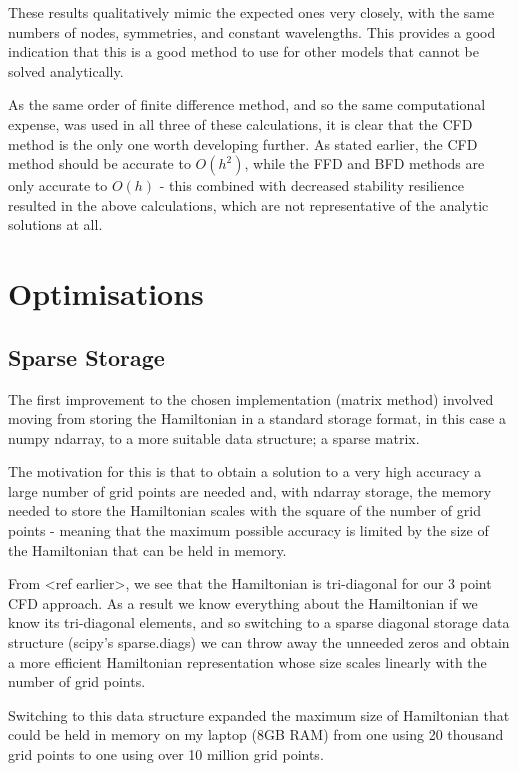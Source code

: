 These results qualitatively mimic the expected ones very closely, with the same numbers of nodes, symmetries, and constant wavelengths. This provides a good indication that this is a good method to use for other models that cannot be solved analytically.

As the same order of finite difference method, and so the same computational expense, was used in all three of these calculations, it is clear that the CFD method is the only one worth developing further. As stated earlier, the CFD method should be accurate to $O(h^{2})$, while the FFD and BFD methods are only accurate to $O(h)$ - this combined with decreased stability resilience resulted in the above calculations, which are not representative of the analytic solutions at all.

\section{Optimisations}

\subsection{Sparse Storage}
The first improvement to the chosen implementation (matrix method) involved moving from storing the Hamiltonian in a standard storage format, in this case a numpy ndarray, to a more suitable data structure; a sparse matrix. 

The motivation for this is that to obtain a solution to a very high accuracy a large number of grid points are needed and, with ndarray storage, the memory needed to store the Hamiltonian scales with the square of the number of grid points - meaning that the maximum possible accuracy is limited by the size of the Hamiltonian that can be held in memory. 

From <ref earlier>, we see that the Hamiltonian is tri-diagonal for our 3 point CFD approach. As a result we know everything about the Hamiltonian if we know its tri-diagonal elements, and so switching to a sparse diagonal storage data structure (scipy's sparse.diags) we can throw away the unneeded zeros and obtain a more efficient Hamiltonian representation whose size scales linearly with the number of grid points. 

Switching to this data structure expanded the maximum size of Hamiltonian that could be held in memory on my laptop (8GB RAM) from one using 20 thousand grid points to one using over 10 million grid points.

